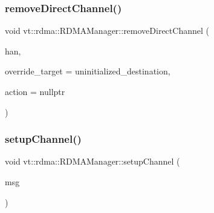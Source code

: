 \subsubsection{\texorpdfstring{remove\+Direct\+Channel()}{removeDirectChannel()}}
{\footnotesize\ttfamily void vt\+::rdma\+::\+R\+D\+M\+A\+Manager\+::remove\+Direct\+Channel (\begin{DoxyParamCaption}\item[{\hyperlink{namespacevt_a10442579ec4e7ebef223818e64bcf908}{R\+D\+M\+A\+\_\+\+Handle\+Type} const \&}]{han,  }\item[{\hyperlink{namespacevt_a866da9d0efc19c0a1ce79e9e492f47e2}{Node\+Type} const \&}]{override\+\_\+target = {\ttfamily uninitialized\+\_\+destination},  }\item[{\hyperlink{namespacevt_ae0a5a7b18cc99d7b732cb4d44f46b0f3}{Action\+Type} const \&}]{action = {\ttfamily nullptr} }\end{DoxyParamCaption})}

\mbox{\label{structvt_1_1rdma_1_1_r_d_m_a_manager_a5189682bba9e4b73faa010bf78f96469}} 
\subsubsection{\texorpdfstring{setup\+Channel()}{setupChannel()}}
{\footnotesize\ttfamily void vt\+::rdma\+::\+R\+D\+M\+A\+Manager\+::setup\+Channel (\begin{DoxyParamCaption}\item[{\hyperlink{structvt_1_1rdma_1_1_create_channel}{Create\+Channel} $\ast$}]{msg }\end{DoxyParamCaption})\hspace{0.3cm}{\ttfamily [static]}}

\mbox{\label{structvt_1_1rdma_1_1_r_d_m_a_manager_a85e3bd458484375b762492ed0d65d9f5}} 
